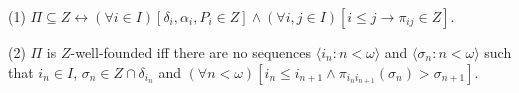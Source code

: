 (1) $\Pi \subseteq Z \leftrightarrow (\forall i \in I)[\delta_i, \alpha_i, P_i \in Z] \wedge (\forall i, j \in I)[i \leq j \rightarrow \pi_{ij} \in Z]$.

(2) $\Pi$ is $Z$-well-founded iff there are no sequences $\langle i_n : n < \omega \rangle$ and $\langle \sigma_n : n < \omega \rangle$ such that $i_n \in I$, $\sigma_n \in Z \cap \delta_{i_n}$ and $(\forall n < \omega)[i_n \leq i_{n+1} \wedge \pi_{i_n i_{n+1}}(\sigma_n) > \sigma_{n+1}]$.
